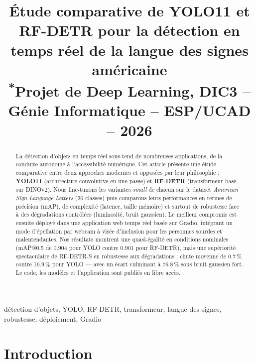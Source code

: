 \documentclass[conference]{IEEEtran}
\begin{document}
\title{Étude comparative de YOLO11 et RF-DETR pour la détection en temps réel de la langue des signes américaine\\
{\footnotesize \textsuperscript{*}Projet de Deep Learning, DIC3 -- Génie Informatique -- ESP/UCAD -- 2026}}

\author{
\and
{}
\and
{}
}

\maketitle

\begin{abstract}
La détection d'objets en temps réel sous-tend de nombreuses applications, de la conduite autonome à l'accessibilité numérique. Cet article présente une étude comparative entre deux approches modernes et opposées par leur philosophie : \textbf{YOLO11} (architecture convolutive en une passe) et \textbf{RF-DETR} (transformeur basé sur DINOv2). Nous fine-tunons les variantes \textit{small} de chacun sur le dataset \textit{American Sign Language Letters} (26 classes) puis comparons leurs performances en termes de précision (mAP), de complexité (latence, taille mémoire) et surtout de robustesse face à des dégradations contrôlées (luminosité, bruit gaussien). Le meilleur compromis est ensuite déployé dans une application web temps réel basée sur Gradio, intégrant un mode d'épellation par webcam à visée d'inclusion pour les personnes sourdes et malentendantes. Nos résultats montrent une quasi-égalité en conditions nominales (mAP@0.5 de 0.904 pour YOLO contre 0.901 pour RF-DETR), mais une supériorité spectaculaire de RF-DETR-S en robustesse aux dégradations : chute moyenne de 0.7\,\% contre 16.9\,\% pour YOLO --- avec un écart culminant à 76.8\,\% sous bruit gaussien fort. Le code, les modèles et l'application sont publiés en libre accès.
\end{abstract}

\begin{IEEEkeywords}
détection d'objets, YOLO, RF-DETR, transformeur, langue des signes, robustesse, déploiement, Gradio
\end{IEEEkeywords}

\section{Introduction}
\end{document}
